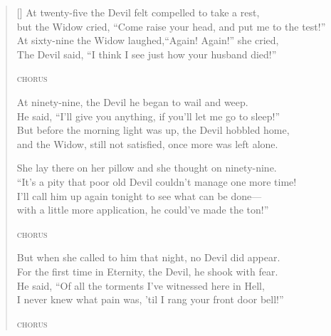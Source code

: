 \begin{verse}[\versewidth]
At twenty-five the Devil felt compelled to take a rest,\\
but the Widow cried, ``Come raise your head, and put me to the test!''\\
At sixty-nine the Widow laughed,``Again! Again!'' she cried,\\
The Devil said, ``I think I see just how your husband died!''

\textsc{chorus}

At ninety-nine, the Devil he began to wail and weep.\\
He said, ``I'll give you anything, if you'll let me go to sleep!''\\
But before the morning light was up, the Devil hobbled home,\\
and the Widow, still not satisfied, once more was left alone.

She lay there on her pillow and she thought on ninety-nine.\\
``It's a pity that poor old Devil couldn't manage one more time!\\
I'll call him up again tonight to see what can be done---\\
with a little more application, he could've made the ton!''

\textsc{chorus}

But when she called to him that night, no Devil did appear.\\
For the first time in Eternity, the Devil, he shook with fear.\\
He said, ``Of all the torments I've witnessed here in Hell,\\
I never knew what pain was, 'til I rang your front door bell!''

\textsc{chorus}

\end{verse}
